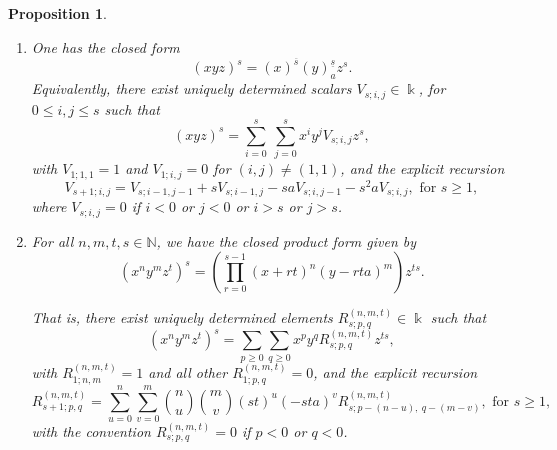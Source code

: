 \documentclass{amsart}
\newtheorem{proposition}[theorem]{Proposition}
\theoremstyle{definition}
\theoremstyle{remark}
\numberwithin{equation}{section}
\begin{document}
\begin{proposition}
\begin{enumerate}
\item[\rm (3)] One has the closed form
\begin{equation}\label{xyzpowercase5v}
\left(xyz\right)^s = (x)^{\overline{s}}(y)^{\underline{s}}_{a} z^{s}.
\end{equation}
Equivalently, there exist uniquely determined scalars $V_{s;i,j}\in\Bbbk$, for $0\le i,j\le s$ such that
\begin{equation}\label{Vdefcase5v}
\left(xyz\right)^s=\sum_{i=0}^{s}\ \sum_{j=0}^{s} x^{i}y^{j} V_{s;i,j} z^{s},
\end{equation}
with $V_{1;1,1}=1$ and $V_{1;i,j}=0$ for $(i,j)\neq(1,1)$, and the explicit recursion
\begin{equation}\label{Vreccase5v}
V_{s+1;i,j}=V_{s;i-1,j-1}+s V_{s;i-1,j}-sa V_{s;i,j-1}-s^{2}a V_{s;i,j}, \text{ for } s\ge 1,
\end{equation}
where $V_{s;i,j}=0$ if $i<0$ or $j<0$ or $i>s$ or $j>s$.

\item[\rm (4)] For all $n,m,t,s\in\mathbb N$, we have the closed product form given by
\begin{equation}\label{generalblockpowercase5v}
\left(x^n y^m z^t\right)^s = \left(\prod_{r=0}^{s-1}(x+rt)^{n}(y-rta)^{m}\right) z^{ts}.
\end{equation}

That is, there exist uniquely determined elements $R^{(n,m,t)}_{s;p,q}\in\Bbbk$ such that
\begin{equation}\label{Rdefcase5v}
\left(x^n y^m z^t\right)^s = \sum_{p\ge 0} \sum_{q\ge 0} x^{p}y^{q} R^{(n,m,t)}_{s;p,q} z^{ts},
\end{equation}
with $R^{(n,m,t)}_{1;n,m}=1$ and all other $R^{(n,m,t)}_{1;p,q}=0$, and the explicit recursion
\begin{equation}\label{Rreccase5v}
R^{(n,m,t)}_{s+1;p,q}=\sum_{u=0}^{n} \sum_{v=0}^{m}\binom{n}{u}\binom{m}{v}\left(st\right)^{u} \left(-sta\right)^{v} R^{(n,m,t)}_{s; p-(n-u),\ q-(m-v)}, \text{ for } s\ge 1,
\end{equation}
with the convention $R^{(n,m,t)}_{s;p,q}=0$ if $p<0$ or $q<0$.


\end{enumerate}
\end{proposition}
\end{document}
